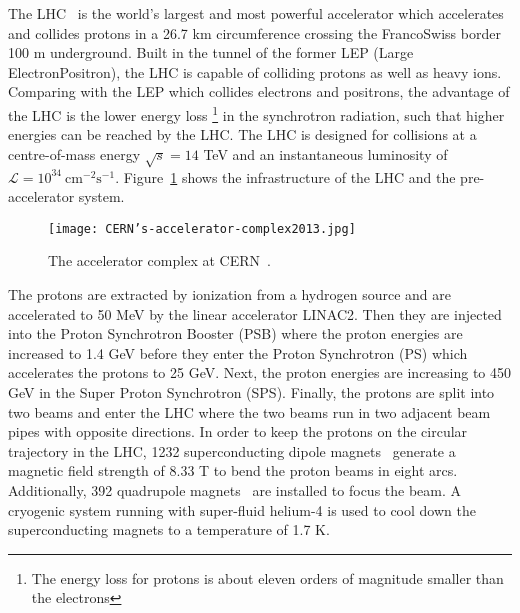 The LHC~\cite{1748-0221-3-08-S08001} is the world's largest and most powerful accelerator which accelerates and collides protons in a 26.7 km circumference crossing the Franco\textendash Swiss border 100 m underground.
Built in the tunnel of the former LEP (Large Electron\textendash Positron), the LHC is capable of colliding protons as well as heavy ions.
Comparing with the LEP which collides electrons and positrons, the advantage of the LHC is the lower energy loss \footnote{The energy loss for protons is about eleven orders of magnitude smaller than the electrons} in the synchrotron radiation, such that higher energies can be reached by the LHC.
The LHC is designed for collisions at a centre-of-mass energy $\sqrt{s}=14$ TeV and an instantaneous luminosity of $\mathcal{L} =10^{34} \ \textrm{cm}^{-2}\textrm{s}^{-1}$.
Figure~\ref{fig:CERN_accelerator_complex} shows the infrastructure of the LHC and the pre-accelerator system.

\begin{figure}[htbp]
\begin{center}
\texttt{[image: CERN's-accelerator-complex2013.jpg]}
\caption{The accelerator complex at CERN~\cite{Marcastel:1621583}.}
\label{fig:CERN_accelerator_complex}
\end{center}
\end{figure}

The protons are extracted by ionization from a hydrogen source and are accelerated to 50 MeV by the linear accelerator LINAC2.
Then they are injected into the Proton Synchrotron Booster (PSB) where the proton energies are increased to 1.4 GeV before they enter the Proton Synchrotron (PS) which accelerates the protons to 25 GeV.
Next, the proton energies are increasing to 450 GeV in the Super Proton Synchrotron (SPS). 
Finally, the protons are split into two beams and enter the LHC where the two beams run in two adjacent beam pipes with opposite directions.
In order to keep the protons on the circular trajectory in the LHC, 1232 superconducting dipole magnets~\cite{1288863} generate a magnetic field strength of 8.33 T to bend the proton beams in eight arcs.
Additionally, 392 quadrupole magnets~\cite{1288863} are installed to focus the beam.
A cryogenic system running with super-fluid helium-4 is used to cool down the superconducting magnets to a temperature of 1.7 K.

